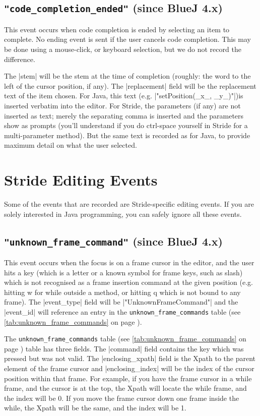 \documentclass{report}
\newcommand{\myref}[1]{\autoref{#1} on page \pageref*{#1}}
\newcommand{\tabref}[1]{\lstinline|#1| table (see \myref{tab:#1})}
\begin{document}
\subsection{\lstinline!"code_completion_ended"! (since BlueJ 4.x)}

This event occurs when code completion is ended by selecting an item to complete.  No ending event is sent if the user cancels code
completion.  This may be done using a mouse-click, or keyboard selection, but we do not record the difference.

The |stem| will be the stem at the time of completion (roughly: the word to the left of the cursor position, if any).  The
|replacement| field will be the replacement text of the item chosen.  For Java, this text (e.g. |"setPosition(_x_, _y_)"|)is inserted verbatim
into the editor.  For Stride, the parameters (if any) are not inserted as text; merely the separating comma is inserted and the
parameters show as prompts (you'll understand if you do ctrl-space yourself in Stride for a multi-parameter method).  But the same text
is recorded as for Java, to provide maximum detail on what the user selected.

\section{Stride Editing Events}

Some of the events that are recorded are Stride-specific editing events.  If you are solely interested
in Java programming, you can safely ignore all these events.

\subsection{\lstinline!"unknown_frame_command"! (since BlueJ 4.x)}

This event occurs when the focus is on a frame cursor in the editor, and the user hits a key
(which is a letter or a known symbol for frame keys, such as slash) which is not recognised as a
frame insertion command at the given position (e.g. hitting w for while outside a method, or
hitting q which is not bound to any frame).  The |event_type| field will be |"UnknownFrameCommand"|
and the |event_id| will reference an entry in the \tabref{unknown_frame_commands}.


The \tabref{unknown_frame_commands} table has three fields.  The |command| field contains the key which
was pressed but was not valid.  The |enclosing_xpath| field is the Xpath to the parent element of the
 frame cursor and |enclosing_index| will be the index of the cursor position within that frame.  For
 example, if you have the frame cursor in a while frame, and the cursor is at the top, the Xpath
 will locate the while frame, and the index will be 0.  If you move the frame cursor down one
 frame inside the while, the Xpath will be the same, and the index will be 1.
\end{document}
